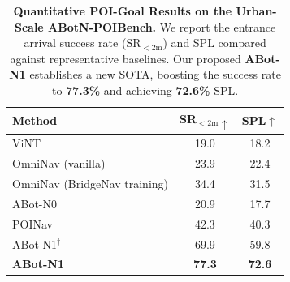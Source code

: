 \begin{table}[t]
\centering
\caption{\textbf{Quantitative POI-Goal Results on the Urban-Scale ABotN-POIBench.} 
We report the entrance arrival success rate ($\text{SR}_{<2\mathrm{m}}$) and SPL compared against representative baselines. 
Our proposed \textbf{ABot-N1} establishes a new SOTA, boosting the success rate to \textbf{77.3\%} and achieving \textbf{72.6\%} SPL.}


\label{tab:exp-poigoal}
\small
\begin{tabular}{lcc}
\toprule
\textbf{Method} & SR$_{<2\mathrm{m}}\uparrow$ & SPL$\uparrow$ \\
\midrule
ViNT \cite{shah2023vint}                        & 19.0 & 18.2 \\
OmniNav (vanilla) \cite{xue2025omninav}           & 23.9 & 22.4 \\
OmniNav (BridgeNav training)\cite{xue2025omninav} & 34.4 & 31.5 \\
ABot-N0   \cite{abotn0}                   & 20.9 & 17.7 \\
POINav~\cite{gong2026poinav} & 42.3 & 40.3 \\
\midrule
ABot-N1$^\dagger$             & 69.9 & 59.8 \\
\textbf{ABot-N1}           & \textbf{77.3} & \textbf{72.6} \\
\bottomrule
\end{tabular}
\end{table}

